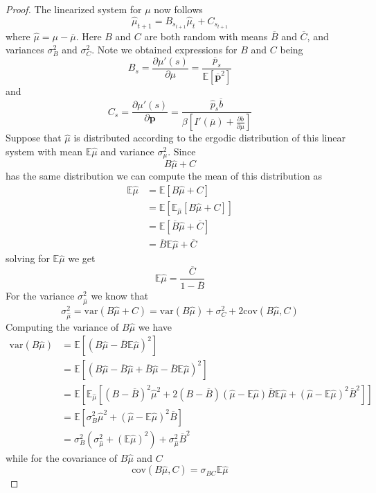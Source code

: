 \documentclass[12pt]{article}
\newcommand{\EE}{\mathbb E}
\newcommand{\var}{\text{var}}
\newcommand{\cov}{\text{cov}}
\newcommand{\barB}{{\overline B}}
\newcommand{\barC}{{\overline C}}
\newcommand{\pbar}{{\overline p}}
\newcommand{\bbar}{{\overline b}}
\newcommand{\mubar}{{\overline \mu}}
\begin{document}
\begin{appendix}
\begin{proof}
The linearized system for $\mu$ now follows
\[
	\hat \mu_{t+1} = B_{s_{t+1}} \hat\mu_t + C_{s_{t+1}}
\]  where $\hat\mu = \mu -\mubar$.  Here $B$ and $C$ are both random with means $\barB$ and $\barC$, and variances $\sigma_B^2$ and $\sigma_C^2$.  Note we obtained expressions for $B$ and $C$ being
\begin{equation}
	B_s = \frac{\partial \mu'(s)}{\partial \mu} = \frac{\pbar_s}{\EE[\bm\pbar^2]}\label{eq.B_s}
\end{equation}and
\begin{equation}
	C_s = \frac{\partial \mu'(s)}{\partial \bm p} = \frac{\hat p_s\bbar}{\beta\left[I'(\mubar)+\frac{\partial b}{\partial\mu}\right]}\label{eq.C_s}
\end{equation}    Suppose that $\hat\mu$ is distributed according to the ergodic distribution of this linear system with mean $\EE\hat\mu$ and variance $\sigma^2_\mu$.  Since 
\[
	B\hat\mu +C
\]has the same distribution we can compute the mean of this distribution as
\[
\begin{split}
	\EE\hat\mu &= \EE\left[ B\hat\mu+C\right]\\
			  &= \EE\left[\EE_{\hat\mu}\left[B\hat\mu+C\right]\right]\\
			  &= \EE\left[\barB\hat\mu +\barC\right]\\
			  &=\barB\EE\hat\mu+\barC
\end{split}
\]solving for $\EE\hat\mu$ we get
\begin{equation}
	\EE\hat\mu = \frac{\barC}{1-\barB}
\end{equation}For the variance $\sigma^2_{\hat\mu}$ we know that 
\[
	\sigma^2_{\hat\mu} = \var(B\hat\mu+C) = \var(B\hat\mu) + \sigma_C^2 + 2\cov(B\hat\mu,C)
\]Computing the variance of $B\hat \mu$ we have
\[
\begin{split}
	\var(B\hat\mu) &=\EE\left[(B\hat\mu - \barB\EE\hat\mu)^2\right]\\
			       &=\EE\left[(B\hat\mu-\barB\hat\mu +\barB\hat\mu -\barB\EE\hat\mu)^2\right]\\
			      &=\EE\left[\EE_{\hat\mu}\left[(B-\barB)^2\hat\mu^2 +2(B-\barB)(\hat\mu-\EE\hat\mu)\barB\EE\hat\mu + (\hat\mu-\EE\hat\mu)^2\bar B^2\right]\right]\\
			&=\EE\left[\sigma_B^2\hat\mu^2 +(\hat\mu-\EE\hat\mu)^2\barB\right]\\
			& = \sigma_B^2(\sigma_{\hat\mu}^2+(\EE\hat\mu)^2) + \sigma_{\hat\mu}^2\barB^2
\end{split}
\]while for the covariance of $B\hat\mu$ and $C$
\[
	\cov(B\hat\mu,C) = \sigma_{BC}\EE\hat\mu
\]
\end{proof}
\end{appendix}
\end{document}
